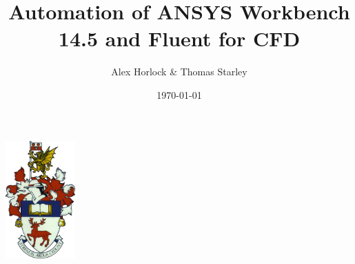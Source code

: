 
\title{\vspace{-3cm} \fontsize{25pt}{1em}\selectfont Automation of ANSYS Workbench 14.5 and Fluent for CFD}
\author{\Large Alex Horlock \& Thomas Starley}
\date{\today}

\begin{center}
\includegraphics[width=0.2\textwidth]{universitycrest.png}~\\[1cm]
{\let\newpage\relax\maketitle}
\end{center}
\restoregeometry